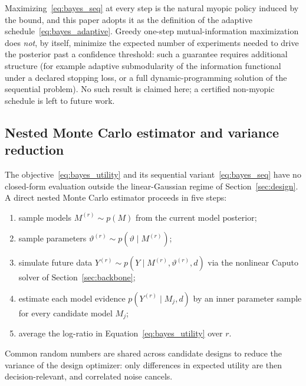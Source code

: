 \begin{remark}
\label{rem:greedy}
Maximizing~\eqref{eq:bayes_seq} at every step is the natural myopic policy induced by the bound, and this paper adopts it as the definition of the adaptive schedule~\eqref{eq:bayes_adaptive}. Greedy one-step mutual-information maximization does \emph{not}, by itself, minimize the expected number of experiments needed to drive the posterior past a confidence threshold: such a guarantee requires additional structure (for example adaptive submodularity of the information functional under a declared stopping loss, or a full dynamic-programming solution of the sequential problem). No such result is claimed here; a certified non-myopic schedule is left to future work.
\end{remark}

\subsection{Nested Monte Carlo estimator and variance reduction}
\label{subsec:bayes:nested}

The objective~\eqref{eq:bayes_utility} and its sequential variant~\eqref{eq:bayes_seq} have no closed-form evaluation outside the linear-Gaussian regime of Section~\ref{sec:design}. A direct nested Monte Carlo estimator proceeds in five steps:
\begin{enumerate}
\item sample models $M^{(r)} \sim p(M)$ from the current model posterior;
\item sample parameters $\vartheta^{(r)} \sim p(\vartheta \mid M^{(r)})$;
\item simulate future data $Y^{(r)} \sim p(Y \mid M^{(r)}, \vartheta^{(r)}, d)$ via the nonlinear Caputo solver of Section~\ref{sec:backbone};
\item estimate each model evidence $p(Y^{(r)} \mid M_j, d)$ by an inner parameter sample for every candidate model $M_j$;
\item average the log-ratio in Equation~\eqref{eq:bayes_utility} over $r$.
\end{enumerate}
Common random numbers are shared across candidate designs to reduce the variance of the design optimizer: only differences in expected utility are then decision-relevant, and correlated noise cancels.

